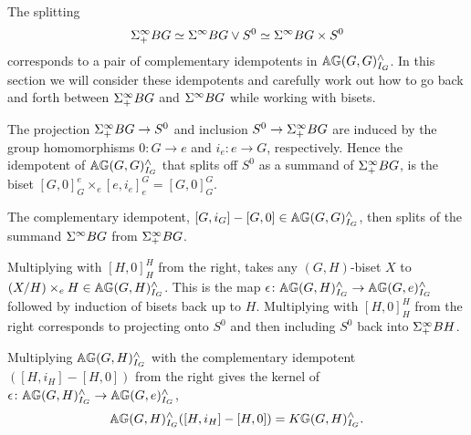 \documentclass[10pt]{amsart}
\theoremstyle{definition}
\begin{document}
The splitting 
\[
\Sigma^{\infty}_{+} BG \simeq \Sigma^{\infty} BG \vee S^0 \simeq \Sigma^{\infty} BG \times S^0
\]
corresponds to a pair of complementary idempotents in $\mathbb{A} \mathbb{G}(G,G)^\wedge_{I_G}$. In this section we will consider these idempotents and carefully work out how to go back and forth between $\Sigma^{\infty}_{+} BG$ and $\Sigma^{\infty} BG$ while working with bisets. 

The projection $\Sigma^{\infty}_{+} BG\to S^0$ and inclusion $S^0\to \Sigma^{\infty}_{+} BG$ are induced by the group homomorphisms $0\colon G\to e$ and $i_e\colon e\to G$, respectively. Hence the idempotent of $\mathbb{A} \mathbb{G}(G,G)^\wedge_{I_G}$ that splits off $S^0$ as a summand of $\Sigma^{\infty}_{+} BG$, is the biset $[G,0]_G^e\times_e [e,i_e]_e^G = [G,0]_G^G$.

The complementary idempotent, $[G,i_G]-[G,0]\in \mathbb{A} \mathbb{G}(G,G)^\wedge_{I_G}$, then splits of the summand $\Sigma^{\infty} BG$ from $\Sigma^{\infty}_{+} BG$.

Multiplying with $[H,0]_H^H$ from the right, takes any $(G,H)$-biset $X$ to $(X/H)\times_e H \in \mathbb{A} \mathbb{G}(G,H)^\wedge_{I_G}$. This is the map $\epsilon\colon \mathbb{A} \mathbb{G}(G,H)^\wedge_{I_G} \to \mathbb{A} \mathbb{G}(G,e)^\wedge_{I_G}$ followed by induction of bisets back up to $H$. Multiplying with  $[H,0]_H^H$ from the right corresponds to projecting onto $S^0$ and then including $S^0$ back into $\Sigma^{\infty}_{+} BH$.

Multiplying $\mathbb{A} \mathbb{G}(G,H)^\wedge_{I_G}$ with the complementary idempotent $([H,i_H]-[H,0])$ from the right gives the kernel of $\epsilon\colon \mathbb{A} \mathbb{G}(G,H)^\wedge_{I_G}\to \mathbb{A} \mathbb{G}(G,e)^\wedge_{I_G}$,
\[\mathbb{A} \mathbb{G}(G,H)^\wedge_{I_G}([H,i_H]-[H,0]) = K \mathbb{G}(G,H)^\wedge_{I_G}.\]
\end{document}
